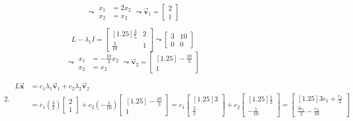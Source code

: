 \documentclass[letter,11pt]{article}
\theoremstyle{definition}
\begin{document}
\begin{tcolorbox}
\begin{enumerate}[label = (\Alph*.)]
\begin{minipage}{0.5\textwidth}
            $$\leadsto\begin{aligned}
                 x_{1} &= 2x_{2}\\
                x_{2} &= x_{2}
            \end{aligned} \leadsto \vec{\boldsymbol{v}}_1 = \begin{bmatrix}2\\1\end{bmatrix}$$
            \end{minipage}%
            \begin{minipage}{0.5\textwidth}
            $$L-\lambda_{1}I = \begin{bmatrix}[1.25] \frac{3}{5} & 2\\ \frac{3}{10} & 1 \end{bmatrix}\leadsto \begin{bmatrix} 3 & 10 \\ 0 & 0\end{bmatrix}$$
            $$\leadsto\begin{aligned}
                 x_{1} &= -\frac{10}{3}x_{2}\\
                x_{2} &= x_{2}
            \end{aligned} \leadsto \vec{\boldsymbol{v}}_2 = \begin{bmatrix}[1.25]-\frac{10}{3}\\1\end{bmatrix}$$
            \end{minipage}
        \item 
            \begin{align*}
                L\vec{\boldsymbol{x}} &= c_{1}\lambda_{1}\vec{\boldsymbol{v}}_{1} + c_{2}\lambda_{2}\vec{\boldsymbol{v}}_{2}\\
                &= c_{1} \left(\frac{3}{2}\right)\begin{bmatrix} 2 \\ 1 \end{bmatrix} + c_{2} \left(-\frac{1}{10}\right)\begin{bmatrix}[1.25] -\frac{10}{3} \\ 1 \end{bmatrix} = c_{1}\begin{bmatrix}[1.25] 3 \\ \frac{3}{2} \end{bmatrix} + c_{2} \begin{bmatrix}[1.25] \frac{1}{3} \\ -\frac{1}{10} \end{bmatrix} = \begin{bmatrix}[1.25] 3c_{1} + \frac{c_{2}}{3}\\ \frac{3c_{1}}{2}-\frac{c_{2}}{10} \end{bmatrix}

\end{align*}
\end{enumerate}
\end{tcolorbox}
\end{document}
